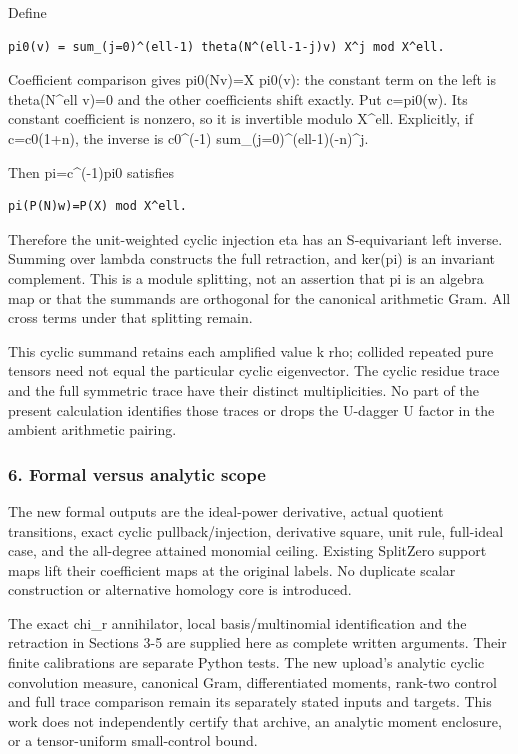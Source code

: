 Define

\begin{verbatim}
pi0(v) = sum_(j=0)^(ell-1) theta(N^(ell-1-j)v) X^j mod X^ell.
\end{verbatim}

Coefficient comparison gives pi0(Nv)=X pi0(v): the constant term on the left is theta(N\^{}ell v)=0
and the other coefficients shift exactly. Put c=pi0(w). Its constant coefficient is nonzero, so it
is invertible modulo X\^{}ell. Explicitly, if c=c0(1+n), the inverse is c0\^{}(-1)
sum\_(j=0)\^{}(ell-1)(-n)\^{}j.

Then pi=c\^{}(-1)pi0 satisfies

\begin{verbatim}
pi(P(N)w)=P(X) mod X^ell.
\end{verbatim}

Therefore the unit-weighted cyclic injection eta has an S-equivariant left inverse. Summing over
lambda constructs the full retraction, and ker(pi) is an invariant complement. This is a module
splitting, not an assertion that pi is an algebra map or that the summands are orthogonal for the
canonical arithmetic Gram. All cross terms under that splitting remain.

This cyclic summand retains each amplified value k rho; collided repeated pure tensors need not
equal the particular cyclic eigenvector. The cyclic residue trace and the full symmetric trace have
their distinct multiplicities. No part of the present calculation identifies those traces or drops
the U-dagger U factor in the ambient arithmetic pairing.

\subsubsection{6. Formal versus analytic scope}\label{conormal_cyclic_pr21:formal-versus-analytic-scope}

The new formal outputs are the ideal-power derivative, actual quotient transitions, exact cyclic
pullback/injection, derivative square, unit rule, full-ideal case, and the all-degree attained
monomial ceiling. Existing SplitZero support maps lift their coefficient maps at the original
labels. No duplicate scalar construction or alternative homology core is introduced.

The exact chi\_r annihilator, local basis/multinomial identification and the retraction in Sections
3-5 are supplied here as complete written arguments. Their finite calibrations are separate Python
tests. The new upload's analytic cyclic convolution measure, canonical Gram, differentiated moments,
rank-two control and full trace comparison remain its separately stated inputs and targets. This
work does not independently certify that archive, an analytic moment enclosure, or a tensor-uniform
small-control bound.

